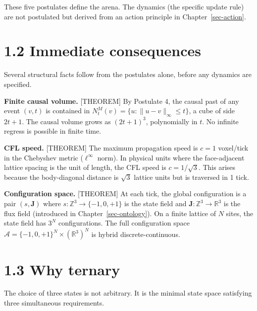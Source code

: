 \documentclass[
  11pt,
  letterpaper,
  twoside,
  openright]{book}
\begin{document}
These five postulates define the arena. The dynamics (the specific
update rule) are not postulated but derived from an action principle in
Chapter~\ref{sec-action}.

\section{1.2 Immediate consequences}\label{immediate-consequences}

Several structural facts follow from the postulates alone, before any
dynamics are specified.

\textbf{Finite causal volume.} {[}THEOREM{]} By Postulate 4, the causal
past of any event \((v, t)\) is contained in
\(N^M_t(v) = \{ u : \|u - v\|_\infty \leq t \}\), a cube of side
\(2t + 1\). The causal volume grows as \((2t+1)^3\), polynomially in
\(t\). No infinite regress is possible in finite time.

\textbf{CFL speed.} {[}THEOREM{]} The maximum propagation speed is
\(c = 1\) voxel/tick in the Chebyshev metric (\(\ell^\infty\) norm). In
physical units where the face-adjacent lattice spacing is the unit of
length, the CFL speed is \(c = 1/\sqrt{3}\). This arises because the
body-diagonal distance is \(\sqrt{3}\) lattice units but is traversed in
1 tick.

\textbf{Configuration space.} {[}THEOREM{]} At each tick, the global
configuration is a pair \((s, \mathbf{J})\) where
\(s : \mathbb{Z}^3 \to \{-1, 0, +1\}\) is the state field and
\(\mathbf{J} : \mathbb{Z}^3 \to \mathbb{R}^3\) is the flux field
(introduced in Chapter~\ref{sec-ontology}). On a finite lattice of \(N\)
sites, the state field has \(3^N\) configurations. The full
configuration space
\(\mathcal{A} = \{-1, 0, +1\}^N \times (\mathbb{R}^3)^N\) is hybrid
discrete-continuous.

\section{1.3 Why ternary}\label{sec-ternary}

The choice of three states is not arbitrary. It is the minimal state
space satisfying three simultaneous requirements.
\end{document}
